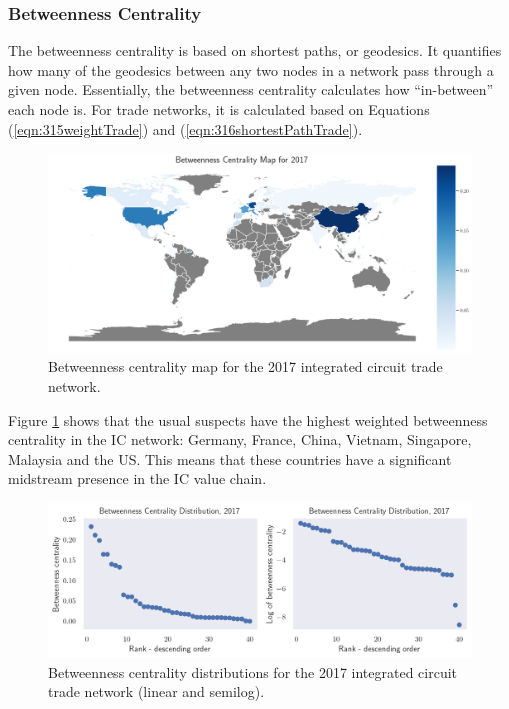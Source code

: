 \documentclass[12pt,letterpaper]{report}
\begin{document}
			\subsubsection{Betweenness Centrality}
			\label{ssec:5223betweenness}
			
			The betweenness centrality is based on shortest paths, or geodesics. It quantifies how many of the geodesics between any two nodes in a network pass through a given node. Essentially, the betweenness centrality calculates how “in-between” each node is. For trade networks, it is calculated based on Equations (\ref{eqn:315weightTrade}) and (\ref{eqn:316shortestPathTrade}).
			
			\begin{figure}[!h]
				\centering
				\includegraphics[width=\textwidth]{Fig509-BetweennessMap.png}
				\caption{Betweenness centrality map for the 2017 integrated circuit trade network.}\label{fig:509BetweennessMap}
			\end{figure}
			
			Figure \ref{fig:509BetweennessMap} shows that the usual suspects have the highest weighted betweenness centrality in the IC network: Germany, France, China, Vietnam, Singapore, Malaysia and the US. This means that these countries have a significant midstream presence in the IC value chain.
			
			\begin{figure}[!h]
				\centering
				\includegraphics[width=\textwidth]{Fig510-BetweennessDistribution.png}
				\caption{Betweenness centrality distributions for the 2017 integrated circuit trade network (linear and semilog).}\label{fig:510BetweennessDistribution}
			\end{figure}
			
\end{document}
